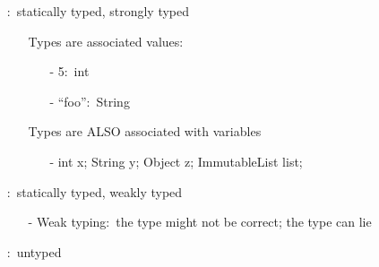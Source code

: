 \documentclass[12pt,a4paper]{article}
\begin{document}
\begin{enumerate}
    \item[] :\ statically typed, strongly typed
    \begin{itemize}
      \item[] Types are associated values:\
      \begin{itemize}
        \item[-] 5:\ int
        \item[-] ``foo'':\ String
      \end{itemize}
      \item[] Types are ALSO associated with variables
      \begin{itemize}
        \item[-] int x; String y; Object z; ImmutableList list;
      \end{itemize}
    \end{itemize} 
    \item[] :\ statically typed, weakly typed
    \begin{itemize}
      \item[-] Weak typing:\ the type might not be correct; the type can lie 
    \end{itemize} 
    \item[] :\ untyped
  \end{enumerate}
\end{document}

